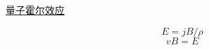 
\begin{issues}
\issueDraft
\end{issues}

\href{https://en.wikipedia.org/wiki/Fractional_quantum_Hall_effect}{量子霍尔效应}

\begin{equation}
E = jB/\rho
\end{equation}
\begin{equation}
vB = E
\end{equation}
